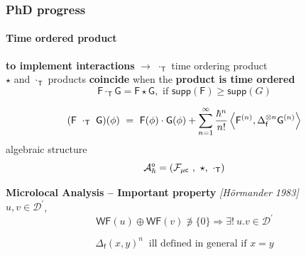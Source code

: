 \documentclass[9pt]{beamer}
\newcommand{\Smearip}[1]{\left\langle #1 \right\rangle} %
\newcommand{\WF}{\mathsf{WF}} %
\newcommand{\supp}{\mathsf{supp}} %
\newcommand{\citebeam}[1]{\textit{\textcolor{black!60!white}{[#1]}}} %
\newcommand{\Acal}{\mathcal{A}}
\newcommand{\Dcal}{\mathcal{D}}
\newcommand{\Fcal}{\mathcal{F}}
\newcommand{\Fsf}{\mathsf{F}}
\newcommand{\Gsf}{\mathsf{G}}
\newcommand{\Psf}{\mathsf{P}}
\newcommand{\Tsf}{\mathsf{T}}
\newcommand{\csf}{\mathsf{c}}
\newcommand{\fsf}{\mathsf{f}}
\begin{document}
\begin{frame}

\frametitle{PhD progress}
\framesubtitle{Time ordered product}

\textbf{to implement interactions} $\to$ $\cdot_\Tsf$ time ordering product \\[2pt]
%
$\star$ and $\cdot_\Tsf$ products \textbf{coincide} when the \textbf{product is time ordered} \\[-8pt]
%
\begin{equation*}
\Fsf \cdot_\Tsf \Gsf = \Fsf \star \Gsf, \mbox{ if } \supp(\Fsf) \geq \supp(G)
\end{equation*}

\begin{equation*}
(\Fsf \ \cdot_\Tsf \ \Gsf)(\phi) \ = \ \Fsf(\phi) \cdot \Gsf(\phi) + \sum_{n=1}^{\infty} \frac{\hbar^n}{n!} \Smearip{\Fsf^{(n)},\Delta_{\fsf}^{\otimes n} \Gsf^{(n)}}
\vspace*{-10pt}
\end{equation*}
%
algebraic structure 
\begin{equation*}
\Acal_\hbar^\mathsf{o} = \left( \Fcal_{\mu\csf} \ , \ \star , \ \cdot_\Tsf \right)
\vspace*{-25pt}
\end{equation*}
%
\begin{block}{}
\vspace*{-10pt}
\textbf{Microlocal Analysis --  Important property} \citebeam{Hörmander 1983} \\[2pt]
$u,v \in \Dcal^\prime$, 
\vspace*{-16pt}
\begin{equation*}
\WF(u) \oplus \WF(v) \not\ni \{0\} \Rightarrow \exists! \ u.v \in \Dcal^\prime
\end{equation*}
\vspace*{-16pt}
\end{block}

\vspace*{-14pt}

\begin{equation*}
\Delta_\fsf(x,y)^n \ \mbox{ ill defined in general if } x = y 
\end{equation*}

\end{frame}  

\end{document}

